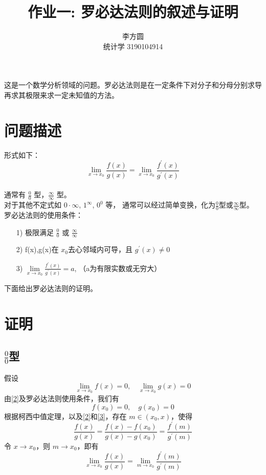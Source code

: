 \documentclass{ctexart}
\title{作业一: 罗必达法则的叙述与证明}
\author{李方圆 \\ 统计学 3190104914}
\begin{document}
\maketitle


这是一个数学分析领域的问题。罗必达法则是在一定条件下对分子和分母分别求导再求其极限来求一定未知值的方法。
\section{问题描述}
形式如下：
\begin{equation}\label{1}
  \lim\limits_{x \to x_{0} } \frac{f(x)}{g(x)} = \lim\limits_{x \to x_{0}} \frac{f^{'}(x)}{g^{'}(x)}
  \tag{1}
\end{equation}
\\
通常有 $\frac{0}{0}$ 型，$\frac{\infty}{\infty}$ 型。
\\
对于其他不定式如 $0 \cdot \infty$, $1^{\infty}$, $0^{0}$ 等，
通常可以经过简单变换，化为$\frac{0}{0}$型或$\frac{\infty}{\infty}$型。
\\
罗必达法则的使用条件：
\begin{itemize}
    \item [1)] 
    极限满足 $ \frac{0}{0} $ 或 $ \frac{\infty}{\infty} $
    \item [2)]
    f(x),g(x)在 $ x_{0} $去心邻域内可导，且 $ g^{'}(x) \neq 0 $
    \item [3)]
    $ \lim\limits_{x \to x_{0}} \frac{f^{'}(x)}{g^{'}(x)} = a $, （a为有限实数或无穷大）
\end{itemize}
下面给出罗必达法则的证明。
\section{证明}

\subsection*{$\frac{0}{0}$型}
假设
\begin{equation}\label{2}
  \lim\limits_{x \to x_{0}} f(x) = 0, \quad  \lim\limits_{x \to x_{0}} g(x) = 0 \tag{2}
\end{equation}
由\ref{2}及罗必达法则使用条件，我们有
\begin{equation}\label{3}
  f(x_{0})=0, \quad g(x_{0})=0 \tag{3}
\end{equation}
根据柯西中值定理，以及\ref{2}和\ref{3}，存在 $m \in (x_{0},x)  $，使得
\begin{equation}\label{4}
  \frac{f(x)}{g(x)} = \frac{f(x)-f(x_{0})}{g(x)-g(x_{0})} = \frac{f^{'}(m)}{g^{'}(m)} \tag{4}
\end{equation}
令 $ x \to x_{0} $，则 $ m \to x_{0} $，即有
\begin{equation}\label{5}
  \lim\limits_{x \to x_{0}} \frac{f(x)}{g(x)} = \lim\limits_{m \to x_{0}} \frac{f^{'}(m)}{g^{'}(m)} \tag{5}
\end{equation}
\end{document}
